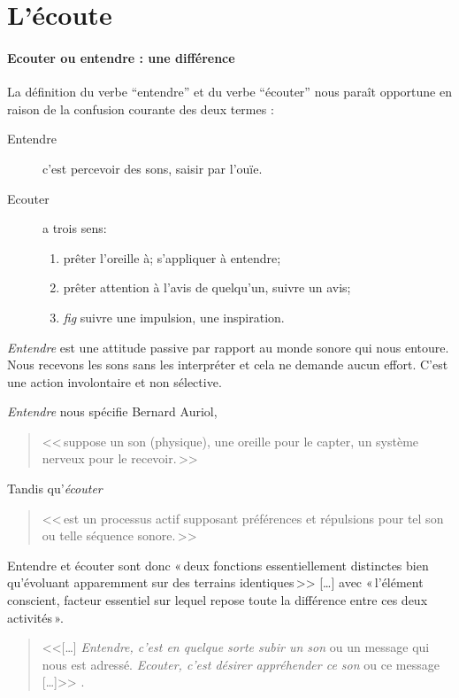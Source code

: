 
\section{L'écoute}


\paragraph{Ecouter ou entendre : une différence}

La définition du verbe ``entendre'' et du verbe ``écouter'' 
\autocite[pp. 361--385]{hachette:dictionnaire} nous paraît opportune
en raison de la confusion courante des deux termes :
\begin{description}
\item[Entendre] c'est  percevoir des sons, saisir par l'ouïe.
\item[Ecouter] a trois sens: 
\begin{enumerate}
	\item prêter l'oreille à; s'appliquer à entendre;
	\item prêter attention à l'avis de quelqu'un, suivre un avis;
	\item \emph{fig} suivre une impulsion,	une inspiration.
\end{enumerate}
\end{description}

\emph{Entendre} est une attitude passive par rapport au monde sonore
qui nous entoure. Nous recevons les sons sans les interpréter et cela
ne demande aucun effort. C'est une action involontaire et non
sélective.

\textit{Entendre} nous spécifie Bernard Auriol, \autocite[p. 2, ch . 1]{auriol:cle}
\begin{quote}
	<<\,suppose un son (physique), une oreille
	pour le capter, un système nerveux pour le recevoir.\,>>
\end{quote} 
Tandis qu'\textit{écouter}
\begin{quote}
	<<\,est un
	processus actif supposant préférences et répulsions pour tel son ou
	telle séquence sonore.\,>>
\end{quote}


Entendre et écouter sont donc  «\,deux
fonctions essentiellement distinctes bien qu'évoluant apparemment sur
des terrains identiques\,>>
[\dots] avec «\,l'élément conscient, facteur essentiel sur lequel repose toute la
différence entre ces deux activités\,».\autocite[]{tomatis_oreille_1991}
\begin{quote}
	
	<<[\ldots] \emph{Entendre, c'est en quelque sorte subir
		un son} ou un message qui nous est adressé. \emph{Ecouter, c'est désirer appréhender ce son} ou ce message [\ldots]>>
	\autocite{tomatis:education}.	
\end{quote}



